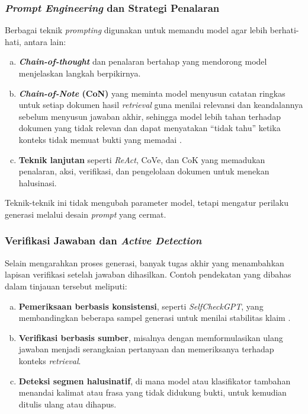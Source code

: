 \subsubsection{\textit{Prompt Engineering} dan Strategi Penalaran}

Berbagai teknik \textit{prompting} digunakan untuk memandu model agar lebih berhati-hati, antara lain:

\begin{enumerate}[a.]
  \item \textbf{\textit{Chain-of-thought}} dan penalaran bertahap yang mendorong model menjelaskan langkah berpikirnya.
  \item \textbf{\textit{Chain-of-Note} (CoN)} yang meminta model menyusun catatan ringkas untuk setiap dokumen hasil \textit{retrieval} guna menilai relevansi dan keandalannya sebelum menyusun jawaban akhir, sehingga model lebih tahan terhadap dokumen yang tidak relevan dan dapat menyatakan ``tidak tahu'' ketika konteks tidak memuat bukti yang memadai \parencite{yu2024con}.
  \item \textbf{Teknik lanjutan} seperti \textit{ReAct}, CoVe, dan CoK yang memadukan penalaran, aksi, verifikasi, dan pengelolaan dokumen untuk menekan halusinasi.
\end{enumerate}

Teknik-teknik ini tidak mengubah parameter model, tetapi mengatur perilaku generasi melalui desain \textit{prompt} yang cermat.

\subsubsection{Verifikasi Jawaban dan \textit{Active Detection}}

Selain mengarahkan proses generasi, banyak tugas akhir yang menambahkan lapisan verifikasi setelah jawaban dihasilkan. Contoh pendekatan yang dibahas dalam tinjauan tersebut meliputi:

\begin{enumerate}[a.]
  \item \textbf{Pemeriksaan berbasis konsistensi}, seperti \textit{SelfCheckGPT}, yang membandingkan beberapa sampel generasi untuk menilai stabilitas klaim \parencite{selfcheckgpt2023}.
  \item \textbf{Verifikasi berbasis sumber}, misalnya dengan memformulasikan ulang jawaban menjadi serangkaian pertanyaan dan memeriksanya terhadap konteks \textit{retrieval}.
  \item \textbf{Deteksi segmen halusinatif}, di mana model atau klasifikator tambahan menandai kalimat atau frasa yang tidak didukung bukti, untuk kemudian ditulis ulang atau dihapus.
\end{enumerate}

